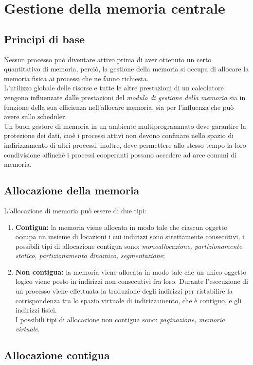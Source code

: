 \documentclass[12pt, letterpaper]{report}
\begin{document}
	\chapter{Gestione della memoria centrale}
	\section{Principi di base}
	Nessun processo può diventare attivo prima di aver ottenuto un certo quantitativo di memoria, perciò, la gestione della memoria si occupa di allocare la memoria fisica ai processi che ne fanno richiesta. \\
	L'utilizzo globale delle risorse e tutte le altre prestazioni di un calcolatore vengono influenzate dalle prestazioni del \textit{modulo di gestione della memoria} sia in funzione della sua efficienza nell'allocare memoria, sia per l'influenza che può avere sullo scheduler. \\
	Un buon gestore di memoria in un ambiente multiprogrammato deve garantire la protezione dei dati, cioè i processi attivi non devono confinare nello spazio di indirizzamento di altri processi, inoltre, deve permettere allo stesso tempo la loro condivisione affinchè i processi cooperanti possano accedere ad aree comuni di memoria.
	\section{Allocazione della memoria}
	L'allocazione di memoria può essere di due tipi:
	\begin{enumerate}
		\item \textbf{Contigua:} la memoria viene allocata in modo tale che ciascun oggetto occupa un insieme di locazioni i cui indirizzi sono strettamente consecutivi, i possibili tipi di allocazione contigua sono: \textit{monoallocazione, partizionamento statico, partizionamento dinamico, segmentazione};
		\item \textbf{Non contigua:} la memoria viene allocata in modo tale che un unico oggetto logico viene posto in indirizzi non consecutivi fra loro. Durante l'esecuzione di un processo viene effettuata la traduzione degli indirizzi per ristabilire la corrispondenza tra lo spazio virtuale di indirizzamento, che è contiguo, e gli indirizzi fisici. \\
		I possibili tipi di allocazione non contigua sono: \textit{paginazione, memoria virtuale}.
	\end{enumerate}
	\section{Allocazione contigua}
\end{document}
